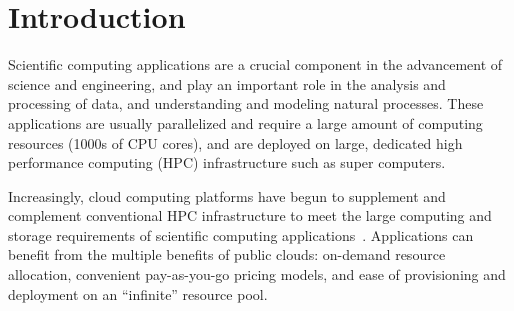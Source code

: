 \vspace*{\largesubsecspace}
\section{Introduction}
\label{sec:intro}








Scientific computing applications are a crucial component in the advancement of science and engineering, and play an important role in the analysis and processing of data, and understanding and modeling natural processes. 
These applications are usually parallelized and require a large amount of computing resources (1000s of CPU cores), and are deployed on large, dedicated high performance computing (HPC) infrastructure such as super computers. 

Increasingly, cloud computing platforms have begun to supplement and complement conventional HPC  infrastructure  to meet the large computing and storage requirements of scientific computing applications~\cite{buyya-hpc-survey}. 
%
Applications can benefit from the multiple benefits of public clouds: on-demand resource allocation, convenient pay-as-you-go pricing models, and ease of provisioning and deployment on an ``infinite'' resource pool. 




